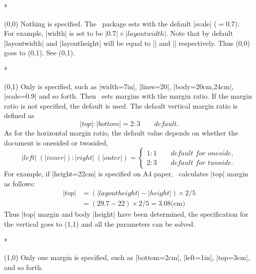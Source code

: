  \begin{Spec}
\begin{paracol}{2}
\switchcolumn[0]*\item[\Ss(0,0)]
 Nothing is specified. The \Gm\ package sets  with the
 default |scale| ($=0.7$). \\ For example, |width| is set to be
 $|0.7|\times|layoutwidth|$. Note that by default |layoutwidth| 
 and |layoutheight| will be equal to |\paperwidth| and |\paperheight|
 respectively.
 Thus \Ss(0,0) goes to \Ss(0,1). See \Ss(0,1).
 \bigskip

 \switchcolumn
\switchcolumn[0]*\item[\Ss(0,1)]
 Only  is specified, such as |width=7in|, |lines=20|,
 |body={20cm,24cm}|, |scale=0.9| and so forth.
 Then \Gm\ sets margins with the margin ratio.
 If the margin ratio is not specified, the default is used.
 The default vertical margin ratio is defined as
 \begin{equation}
  |top| : |bottom| = 2 : 3 \qquad\textit{default}.
 \end{equation}
 As for the horizontal margin ratio, the default value depends on
 whether the document is onesided or twosided,
 \begin{equation}
  |left|\;(|inner|) : |right|\;(|outer|) 
       = \left\{ \begin{array}{ll}
              1 : 1 \qquad\textit{default for oneside},\\
              2 : 3 \qquad\textit{default for twoside}.
         \end{array}\right.
 \end{equation}
 For example, if |height=22cm| is specified on A4 paper, 
 \Gm\ calculates |top| margin as follows:
 \begin{equation}
   \begin{array}{ll}
   |top| &= ( |layoutheight| - |height| ) \times 2/5 \\
         &= (29.7-22)\times2/5 = 3.08\textrm{(cm)}
   \end{array}
 \end{equation}
 Thus |top| margin and body |height| have been determined, the
 specification for the vertical goes to \Ss(1,1) and
 all the parameters can be solved.
 \bigskip

 \switchcolumn
\switchcolumn[0]*\item[\Ss(1,0)]
 Only one margin is specified, such as |bottom=2cm|, |left=1in|,
 |top=3cm|, and so forth.


\end{paracol}
\end{Spec}
